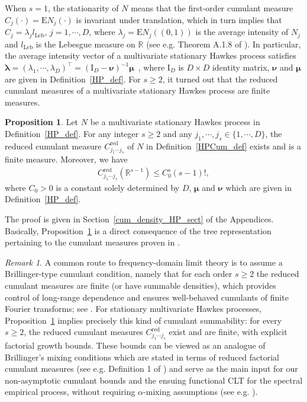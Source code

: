 \documentclass[11pt]{article}
\numberwithin{equation}{section}
\theoremstyle{plain}
\theoremstyle{definition}
\theoremstyle{definition}
\theoremstyle{assumption}
\theoremstyle{proposition}
\newtheorem{proposition}{Proposition}[section]
\theoremstyle{proposition}
\theoremstyle{example}
\theoremstyle{lemma}
\theoremstyle{theorem}
\theoremstyle{remark}
\newtheorem*{remark}{Remark}
\begin{document}
When $s = 1$, the stationarity of $N$ means that the first-order cumulant measure $C_j(\cdot)=\mathrm{E}N_j(\cdot)$ is invariant under translation, which in turn implies that $C_{j} = \lambda_j l_{\mathrm{Leb}}$, $j=1,\cdots,D$, where $\lambda_j = \mathrm{E}N_j((0,1))$ is the average intensity of $N_j$ and $l_{\mathrm{Leb}}$ is the Lebesgue measure on $\mathbb{R}$ (see e.g. Theorem A.1.8 of \citet{Bremaud2020}). In particular, the average intensity vector of a multivariate stationary Hawkes process satisfies $\boldsymbol{\lambda}=(\lambda_1,\cdots,\lambda_D)^{\top}=(\boldsymbol{\mathrm{I}}_D-\boldsymbol{\nu})^{-1}\boldsymbol{\mu}$~\cite[Example 8.3(c)]{Daley_and_Vere-Jones2003}, where $\boldsymbol{\mathrm{I}}_D$ is $D\times D$ identity matrix, $\boldsymbol{\nu}$ and $\boldsymbol{\mu}$ are given in Definition~\ref{HP_def}. For $s\geqslant2$, it turned out that the reduced cumulant measures of a multivariate stationary Hawkes process are finite measures.
\begin{proposition}\label{HPCum_bound_prop}
Let $N$ be a multivariate stationary Hawkes process in Definition~\ref{HP_def}. For any integer $s\geqslant 2$ and any $j_1,\cdots,j_s\in\{1,\cdots,D\}$, the reduced cumulant measure $C_{j_1\cdots j_s}^{\mathrm{red}}$ of $N$ in Definition~\ref{HPCum_def} exists and is a finite measure. Moreover, we have
\begin{align*}
C_{j_1\cdots j_s}^{\mathrm{red}}(\mathbb{R}^{s-1}) \leqslant C_0^s (s-1)!,
\end{align*}
where $C_0>0$ is a constant solely determined by $D$, $\boldsymbol{\mu}$ and $\boldsymbol{\nu}$ which are given in Definition~\ref{HP_def}.
\end{proposition}
The proof is given in Section~\ref{cum_density_HP_sect} of the Appendices. Basically, Proposition~\ref{HPCum_bound_prop} is a direct consequence of the tree representation pertaining to the cumulant measures proven in \citet{Jovanovic_et_al2015}. 
\begin{remark}
{ A common route to frequency-domain limit theory is to assume a Brillinger-type cumulant condition, namely that for each order $s\geqslant2$ the reduced cumulant measures are finite (or have summable densities), which provides control of long-range dependence and ensures well-behaved cumulants of finite Fourier transforms; see \citet{Brillinger1972}. For stationary multivariate Hawkes processes, Proposition~\ref{HPCum_bound_prop} implies precisely this kind of cumulant summability: for every $s\geqslant2$, the reduced cumulant measures $C^{\mathrm{red}}_{j_1\cdots j_s}$ exist and are finite, with explicit factorial growth bounds. These bounds can be viewed as an analogue of Brillinger’s mixing conditions which are stated in terms of reduced factorial cumulant measures (see e.g. Definition 1 of \citet{Heinrich2016}) and serve as the main input for our non-asymptotic cumulant bounds and the ensuing functional CLT for the spectral empirical process, without requiring $\alpha$-mixing assumptions (see e.g. \citet{Cheysson2022_and_Lang2022}).
}    
\end{remark}
\end{document}
